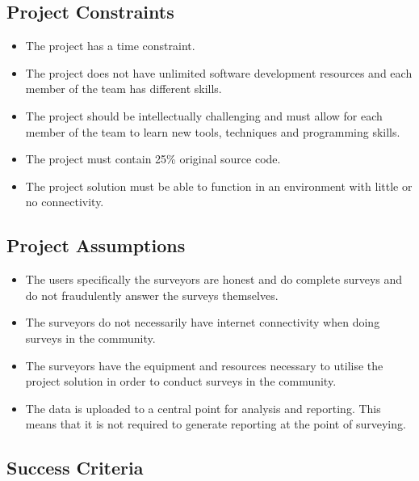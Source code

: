 \documentclass[12pt]{witseiepaper}
\begin{document}
\newpage
\subsection{Project Constraints}
\begin{itemize}
  \item The project has a time constraint. 
  \item The project does not have unlimited software development resources and each member of the team has different skills. 
  \item The project should be intellectually challenging and must allow for each member of the team to learn new tools, techniques and programming skills.
  \item The project must contain 25\% original source code.
  \item The project solution must be able to function in an environment with little or no connectivity.
\end{itemize}

\subsection{Project Assumptions}
\begin{itemize}
  \item The users specifically the surveyors are honest and do complete surveys and do not fraudulently answer the surveys themselves.
  \item The surveyors do not necessarily have internet connectivity when doing surveys in the community.
  \item The surveyors have the equipment and resources necessary to utilise the project solution in order to conduct surveys in the community.
  \item The data is uploaded to a central point for analysis and reporting. This means that it is not required to generate reporting at the point of surveying.
\end{itemize}


\subsection{Success Criteria}
\end{document}
